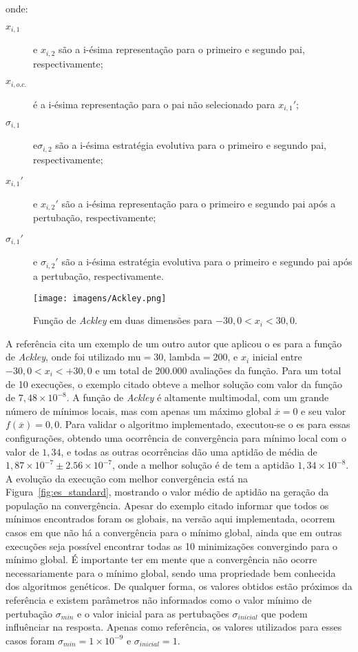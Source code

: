 \noindent onde:

\begin{description}
\item[$x_{i,1}$] e $x_{i,2}$ são a i-ésima representação para o
primeiro e segundo pai, respectivamente; 
\item[$x_{i,o.c.}$] é a i-ésima representação para o pai não
selecionado para $x_{i,1}'$;
\item[$\sigma_{i,1}$] e$\sigma_{i,2}$ são a i-ésima estratégia
evolutiva para o primeiro e segundo pai, respectivamente;
\item[$x_{i,1}'$] e $x_{i,2}'$ são a i-ésima representação para o
primeiro e segundo pai após a pertubação, respectivamente; 
\item[$\sigma_{i,1}'$] e $\sigma_{i,2}'$ são a i-ésima estratégia
evolutiva para o primeiro e segundo pai após a pertubação,
respectivamente.
\end{description}

\begin{figure}[h!t]
\centering
\texttt{[image: imagens/Ackley.png]}
\caption{Função de \emph{Ackley} em duas dimensões para $-30,0< x_i <
30,0$.}
\label{fig:funcao_ackley}
\end{figure}

A referência \cite[p. 84]{eiben2003introduction} cita um exemplo de um
outro autor que aplicou o \acs{es} para a função de \emph{Ackley},
onde foi utilizado \acs{mu}$ = 30$, \acs{lambda}$ = 200$, e $x_i$
inicial entre $-30,0 < x_i < +30,0$ e um total de 200.000 avaliações
da função. Para um total de 10 execuções, o exemplo citado obteve a
melhor solução com valor da função de $7,48\times10^{-8}$. A função de
\emph{Ackley} é altamente multimodal, com um grande número de mínimos
locais, mas com apenas um máximo global $\overline{x}=0$ e seu valor
$f(\overline{x})=0,0$. Para validar o algoritmo implementado, executou-se o
\acs{es} para essas configurações, obtendo uma ocorrência de
convergência para mínimo local com o valor de $1,34$, e todas as
outras ocorrências dão uma aptidão de média de
$1,87\times10^{-7}\pm2.56\times10^{-7}$, onde a melhor solução é de
tem a aptidão $1,34\times10^{-8}$. A evolução da execução com melhor
convergência está na Figura~\ref{fig:es_standard}, mostrando o valor
médio de aptidão na geração da população na convergência. Apesar do exemplo
citado informar que todos os mínimos encontrados foram os globais, na
versão aqui implementada, ocorrem casos em que não há a convergência
para o mínimo global, ainda que em outras execuções seja possível
encontrar todas as 10 minimizações convergindo para o mínimo global. É
importante ter em mente que a convergência não ocorre necessariamente
para o mínimo global, sendo uma propriedade bem conhecida dos
algoritmos genéticos.  De qualquer forma, os valores obtidos estão
próximos da referência e existem parâmetros não informados como o
valor mínimo de pertubação $\sigma_{min}$ e o valor inicial para as
pertubações $\sigma_{inicial}$ que podem influênciar na resposta.
Apenas como referência, os valores utilizados para esses casos foram
$\sigma_{min}=1\times10^{-9}$ e $\sigma_{inicial}=1$.



